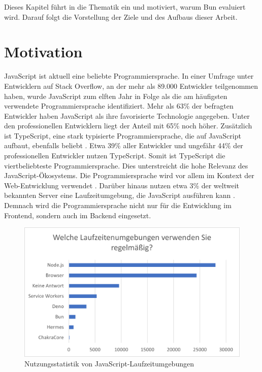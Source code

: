 \pagestyle{fancy-style}
 \label{ch:introduction}
Dieses Kapitel führt in die Thematik ein und motiviert, warum Bun evaluiert wird. Darauf folgt die Vorstellung der Ziele und des Aufbaus dieser Arbeit.

\section{Motivation} \label{sec:introduction-motivation}
JavaScript ist aktuell eine beliebte Programmiersprache. In einer Umfrage unter Entwicklern auf Stack Overflow, an der mehr als 89.000 Entwickler teilgenommen haben, wurde JavaScript zum elften Jahr in Folge als die am häufigsten verwendete Programmiersprache identifiziert. Mehr als 63\% der befragten Entwickler haben JavaScript als ihre favorisierte Technologie angegeben. Unter den professionellen Entwicklern liegt der Anteil mit 65\% noch höher. Zusätzlich ist TypeScript, eine stark typisierte Programmiersprache, die auf 
JavaScript aufbaut, ebenfalls beliebt \cite{Microsoft.o.J.}. Etwa 39\% aller Entwickler und ungefähr 44\% der professionellen Entwickler nutzen TypeScript. Somit ist TypeScript die viertbeliebteste Programmiersprache. Dies unterstreicht die hohe Relevanz des JavaScript-Ökosystems.\cite{StackOverflow.2023}\newline
Die Programmiersprache wird vor allem im Kontext der Web-Entwicklung verwendet \cite{Brown.November2019}. Darüber hinaus nutzen etwa 3\% der weltweit bekannten Server eine Laufzeitumgebung, die JavaScript ausführen kann \cite{QSuccess.2023}. Demnach wird die Programmiersprache nicht nur für die Entwicklung im Frontend, sondern auch im Backend eingesetzt.\\

\begin{figure}[h]
	\centering
	\includegraphics[width=\linewidth]{./images/WhichRuntimesDoYouUseRegularly}
	\caption[Nutzungsstatistik von JavaScript-Laufzeitumgebungen]{Nutzungsstatistik von JavaScript-Laufzeitumgebungen \cite{Greif.2022}}
	\label{fig:runtime-share}
\end{figure}

